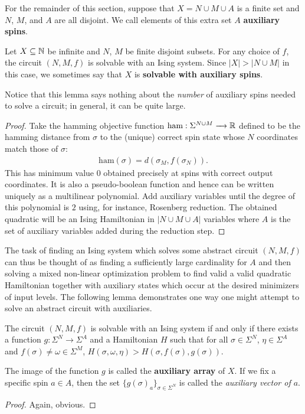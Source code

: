 \documentclass{article}
\begin{document}
For the remainder of this section, suppose that $X = N \cup M \cup A$ is a finite set and $N$, $M$, and $A$ are all disjoint. We call elements of this extra set $A$ \textbf{auxiliary spins}.

\begin{prop}\label{prop:can_solve_with_aux}
  Let $X \subseteq \mathbb{N}$ be infinite and $N$, $M$ be finite disjoint subsets. For any choice of $f$, the circuit $(N, M, f)$ is solvable with an Ising system. Since $|X| > |N\cup M|$ in this case, we sometimes say that $X$ is \textbf{solvable with auxiliary spins}.
\end{prop}
Notice that this lemma says nothing about the \emph{number} of auxiliary spins needed to solve a circuit; in general, it can be quite large.
\begin{proof}
  Take the hamming objective function $\text{ham}:\Sigma^{N\cup M} \to \bR$ defined to be the hamming distance from $\sigma$ to the (unique) correct spin state whose $N$ coordinates match those of $\sigma$:
  \begin{align*}
    \text{ham}(\sigma) = d(\sigma_M, f(\sigma_N)).
  \end{align*}
This has minimum value $0$ obtained precisely at spins with correct output coordinates. It is also a pseudo-boolean function and hence can be written uniquely as a multilinear polynomial. Add auxiliary variables until the degree of this polynomial is $2$ using, for instance, Rosenberg reduction. The obtained quadratic will be an Ising Hamiltonian in $|N \cup M \cup A|$ variables where $A$ is the set of auxiliary variables added during the reduction step. 
\end{proof}

The task of finding an Ising system which solves some abstract circuit $(N, M, f)$ can thus be thought of as finding a sufficiently large cardinality for $A$ and then solving a mixed non-linear optimization problem to find valid a valid quadratic Hamiltonian together with auxiliary states which occur at the desired minimizers of input levels. The following lemma demonstrates one way one might attempt to solve an abstract circuit with auxiliaries. 

\begin{lem}\label{lem:weak_constraints}
  The circuit $(N,M,f)$ is solvable with an Ising system if and only if there exists a function $g:\Sigma^N \to \Sigma^A$ and a Hamiltonian $H$ such that for all $\sigma \in \Sigma^N$, $\eta \in \Sigma^A$ and $f(\sigma) \neq \omega \in \Sigma^M$, $H(\sigma, \omega, \eta) > H(\sigma, f(\sigma), g(\sigma))$.
\end{lem}
The image of the function $g$ is called the \textbf{auxiliary array} of $X$. If we fix a specific spin $a \in A$, then the set $\{g(\sigma)_a\}_{\sigma \in \Sigma^N}$ is called the \emph{auxiliary vector of $a$}.
\begin{proof}
  Again, obvious.
\end{proof}
\end{document}
